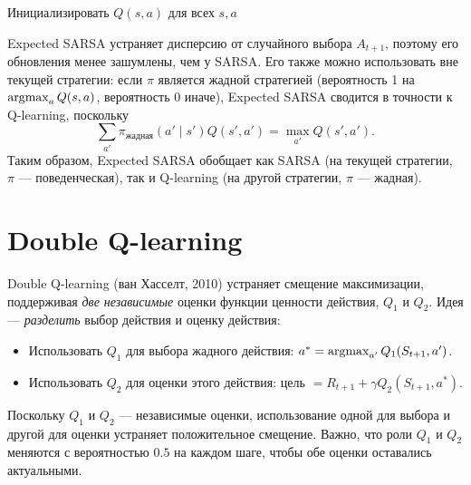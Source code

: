 \begin{algorithm}[ht]
\caption{Expected SARSA}
\label{alg:expected-sarsa}
Инициализировать $Q(s,a)$ для всех $s,a$\;
\end{algorithm}

Expected SARSA устраняет дисперсию от случайного выбора $A_{t+1}$, поэтому его обновления менее зашумлены, чем у SARSA.  Его также можно использовать вне текущей стратегии: если $\pi$ является жадной стратегией (вероятность 1 на $\operatorname*{argmax}_a Q(s,a)$, вероятность 0 иначе), Expected SARSA сводится в точности к Q-learning, поскольку
\[
\sum_{a'}\pi_{\mbox{жадная}}(a'\mid s')Q(s',a') = \max_{a'}Q(s',a').
\]
Таким образом, Expected SARSA обобщает как SARSA (на текущей стратегии, $\pi$ --- поведенческая), так и Q-learning (на другой стратегии, $\pi$ --- жадная).

\section{Double Q-learning}
\label{sec:double-q}

Double Q-learning (ван Хасселт, 2010) устраняет смещение максимизации, поддерживая \emph{две независимые} оценки функции ценности действия, $Q_1$ и $Q_2$.  Идея --- \emph{разделить} выбор действия и оценку действия:
\begin{itemize}[leftmargin=*]
  \item Использовать $Q_1$ для выбора жадного действия: $a^* = \operatorname*{argmax}_{a'} Q_1(S_{t+1},a')$.
  \item Использовать $Q_2$ для оценки этого действия: цель $= R_{t+1} + \gamma Q_2(S_{t+1},a^*)$.
\end{itemize}
Поскольку $Q_1$ и $Q_2$ --- независимые оценки, использование одной для выбора и другой для оценки устраняет положительное смещение.  Важно, что роли $Q_1$ и $Q_2$ меняются с вероятностью $0.5$ на каждом шаге, чтобы обе оценки оставались актуальными.

